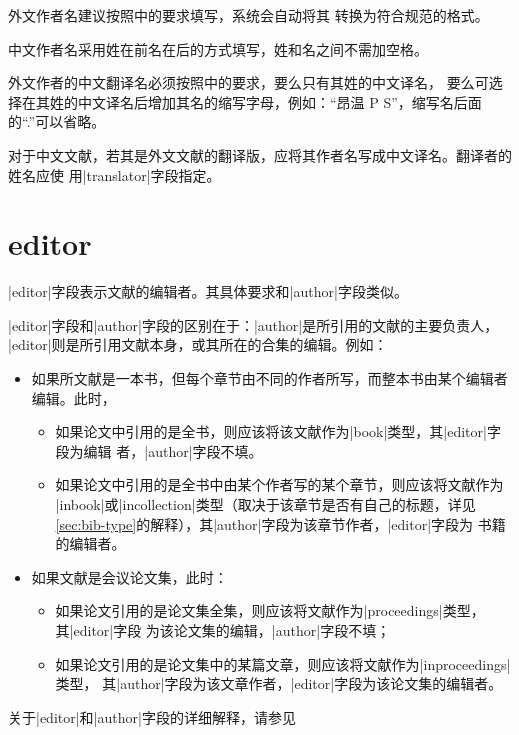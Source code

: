 外文作者名建议按照\cite[157]{lamport1994latex}中的要求填写，{\BibTeX}系统会自动将其
转换为符合\cite{gbt7714-2005}规范的格式。

中文作者名采用姓在前名在后的方式填写，姓和名之间不需加空格。

外文作者的中文翻译名必须按照\cite{gbt7714-2005}中的要求，要么只有其姓的中文译名，
要么可选择在其姓的中文译名后增加其名的缩写字母，例如：``昂温 P S''，缩写名后面
的``.''可以省略。

\begin{note}
对于中文文献，若其是外文文献的翻译版，应将其作者名写成中文译名。翻译者的姓名应使
用|translator|字段指定。
\end{note}

\section{editor}

|editor|字段表示文献的编辑者。其具体要求和|author|字段类似。

|editor|字段和|author|字段的区别在于：|author|是所引用的文献的主要负责人，
|editor|则是所引用文献本身，或其所在的合集的编辑。例如：
\begin{itemize}
\item 如果所文献是一本书，但每个章节由不同的作者所写，而整本书由某个编辑者编辑。此时，
  \begin{itemize}
  \item 如果论文中引用的是全书，则应该将该文献作为|book|类型，其|editor|字段为编辑
    者，|author|字段不填。
  \item 如果论文中引用的是全书中由某个作者写的某个章节，则应该将文献作为
    |inbook|或|incollection|类型（取决于该章节是否有自己的标题，详见
    \autoref{sec:bib-type}的解释），其|author|字段为该章节作者，|editor|字段为
    书籍的编辑者。
  \end{itemize}
\item 如果文献是会议论文集，此时：
  \begin{itemize}
  \item 如果论文引用的是论文集全集，则应该将文献作为|proceedings|类型，其|editor|字段
    为该论文集的编辑，|author|字段不填；
  \item 如果论文引用的是论文集中的某篇文章，则应该将文献作为|inproceedings|类型，
    其|author|字段为该文章作者，|editor|字段为该论文集的编辑者。
  \end{itemize}
\end{itemize}

关于|editor|和|author|字段的详细解释，请参见

